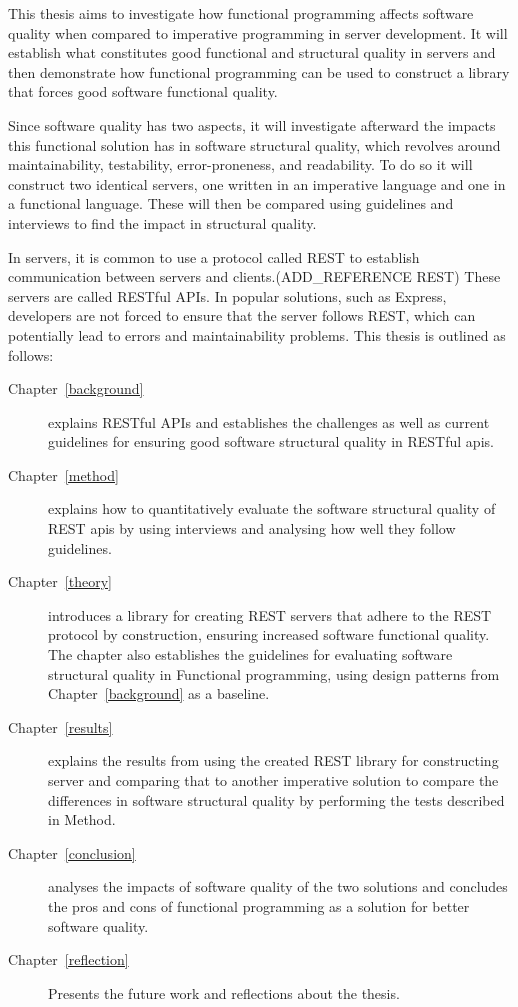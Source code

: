 This thesis aims to investigate how functional programming affects software
quality when compared to imperative programming in server development.  It will
establish what constitutes good functional and structural quality in servers and
then demonstrate how functional programming can be used to construct a library
that forces good software functional quality. 

Since software quality has two aspects, it will investigate afterward the
impacts this functional solution has in software structural quality, which
revolves around maintainability, testability, error-proneness, and readability.
To do so it will construct two identical servers, one written in an imperative
language and one in a functional language.  These will then be compared using
guidelines and interviews to find the impact in structural quality.

In servers, it is common to use a protocol called REST to establish
communication between servers and clients.(ADD\_REFERENCE REST) These servers
are called RESTful APIs. In popular solutions, such as Express, developers are
not forced to ensure that the server follows REST, which can potentially lead to
errors and maintainability problems. This thesis is outlined as follows:

\begin{description}
    \item[Chapter~\ref{background}] explains RESTful APIs and establishes the
    challenges as well as current guidelines for ensuring good software
    structural quality in RESTful apis. 
    \item[Chapter~\ref{method}] explains how to quantitatively evaluate the
    software structural quality of REST apis by using interviews and analysing
    how well they follow guidelines. 
    \item[Chapter~\ref{theory}] introduces a library for creating REST servers
    that adhere to the REST protocol by construction, ensuring increased
    software functional quality. The chapter also establishes the guidelines for
    evaluating software structural quality in Functional programming, using
    design patterns from Chapter~\ref{background} as a baseline.   
    \item[Chapter~\ref{results}] explains the results from using the created
    REST library for constructing server and comparing that to another
    imperative solution to compare the differences in software structural
    quality by performing the tests described in Method.
    \item[Chapter~\ref{conclusion}] analyses the impacts of software quality of
    the two solutions and concludes the pros and cons of functional programming
    as a solution for better software quality.
    \item[Chapter~\ref{reflection}] Presents the future work and reflections
    about the thesis.
\end{description}

